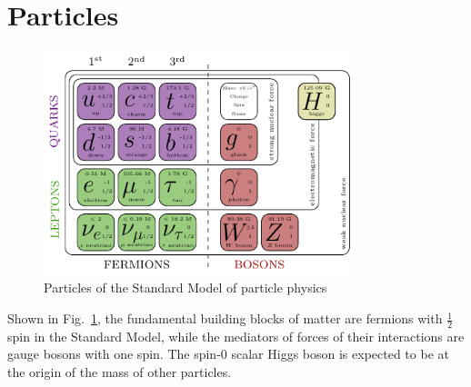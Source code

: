 \section{Particles}
\begin{figure}[htbp]
    \centering
    \includegraphics[width=0.8\textwidth]{chapters/c1/figures/SM-particle-table}
    \caption{Particles of the Standard Model of particle physics}
    \label{fig:c1Standard Modelparticletable}
\end{figure}
\par Shown in Fig.~\ref{fig:c1Standard Modelparticletable}, the fundamental building blocks of matter are fermions with $\frac{1}{2}$ 
spin in the Standard Model, while the mediators of forces of their interactions are gauge bosons with one spin. 
The spin-0 scalar Higgs boson is expected to be at the origin of the mass of other particles.


